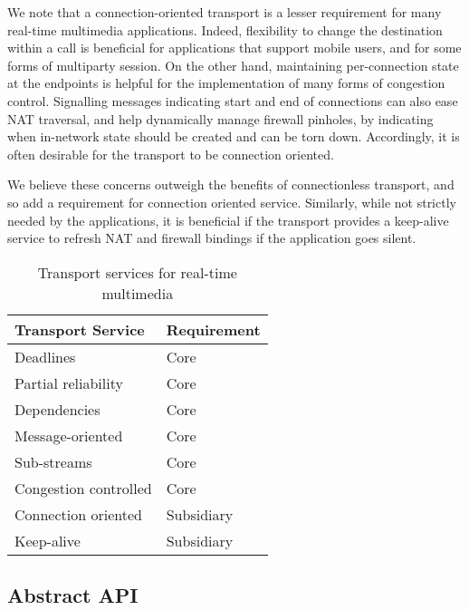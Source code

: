 \documentclass{sig-alternate-05-2015}
\begin{document}
We note that a connection-oriented transport is a lesser requirement for
many real-time multimedia applications. 
Indeed, flexibility to change the destination within a call is beneficial
for applications that support mobile users, and for some forms of multiparty
session.
On the other hand, maintaining per-connection state at the endpoints is
helpful for the implementation of many forms of congestion control.
Signalling messages indicating start and end of connections can also ease
NAT traversal, and help dynamically manage firewall pinholes, by indicating
when in-network state should be created and can be torn down. 
Accordingly, it is often desirable for the transport to be connection
oriented. 

We believe these concerns outweigh the benefits of connectionless transport, and so
add a requirement for connection oriented service. Similarly, while not strictly
needed by the applications, it is beneficial if the transport provides a
keep-alive service to refresh NAT and firewall bindings if the application goes
silent.

\begin{table}
  \centering
  \begin{tabular}{ll}
    \toprule
      Transport Service     & Requirement \\
    \midrule
      Deadlines             & Core        \\
      Partial reliability   & Core        \\
      Dependencies          & Core        \\
      Message-oriented      & Core        \\
      Sub-streams           & Core        \\
      Congestion controlled & Core        \\
      Connection oriented   & Subsidiary  \\
      Keep-alive            & Subsidiary  \\
    \bottomrule
  \end{tabular}
  \caption{Transport services for real-time multimedia}
  \label{tab:services}
\end{table}

\subsection{Abstract API}
\end{document}
